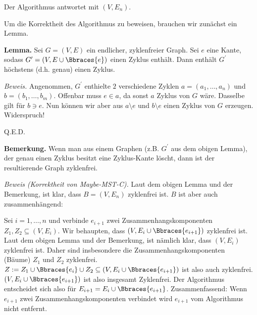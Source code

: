 \begin{solution}
\begin{enumerate}[label = (\Alph*)]
    Der Algorithmus antwortet mit $(V, E_n)$.

    Um die Korrektheit des Algorithmus zu beweisen, brauchen wir zunächst ein Lemma.

    \textbf{Lemma.}
    Sei $G = (V, E)$ ein endlicher, zyklenfreier Graph.
    Sei $e$ eine Kante, sodass $G^\prime = (V, E \cup \Bbraces{e})$ einen Zyklus enthält.
    Dann enthält $G^\prime$ höchstens (d.h. genau) einen Zyklus.

    \textit{Beweis.}
    Angenommen, $G^\prime$ enthielte $2$ verschiedene Zyklen $a = (a_1, \dots, a_n)$ und $b = (b_1, \dots, b_m)$.
    Offenbar muss $e \in a$, da sonst $a$ Zyklus von $G$ wäre.
    Dasselbe gilt für $b \ni e$.
    Nun können wir aber aus $a \setminus e$ und $b \setminus e$ einen Zyklus von $G$ erzeugen.
    Widerspruch!

    Q.E.D.

    \textbf{Bemerkung.}
    Wenn man aus einem Graphen (z.B. $G^\prime$ aus dem obigen Lemma), der genau einen Zyklus besitzt eine Zyklus-Kante löscht, dann ist der resultierende Graph zyklenfrei.

    \textit{Beweis (Korrektheit von Maybe-MST-C).}
    Laut dem obigen Lemma und der Bemerkung, ist klar, dass $B = (V, E_n)$ zyklenfrei ist.
    $B$ ist aber auch zusammenhängend:

    Sei $i = 1, \dots, n$ und verbinde $e_{i+1}$ zwei Zusammenhangskomponenten $Z_1, Z_2 \subseteq (V, E_i)$.
    Wir behaupten, dass $(V, E_i \cup \Bbraces{e_{i+1}})$ zyklenfrei ist.
    Laut dem obigen Lemma und der Bemerkung, ist nämlich klar, dass $(V, E_i)$ zyklenfrei ist.
    Daher sind insbesondere die Zusammenhangskomponenten (Bäume) $Z_1$ und $Z_2$ zyklenfrei.
    $Z := Z_1 \cup \Bbraces{e_i} \cup Z_2 \subseteq (V, E_i \cup \Bbraces{e_{i+1}})$ ist also auch zyklenfrei.
    $(V, E_i \cup \Bbraces{e_{i+1}})$ ist also insgesamt Zyklenfrei.
    Der Algorithmus entscheidet sich also für $E_{i+1} = E_i \cup \Bbraces{e_{i+1}}$.
    Zusammenfassend:
    Wenn $e_{i+1}$ zwei Zusammenhangskomponenten verbindet wird $e_{i+1}$ vom Algorithmus nicht entfernt.


\end{enumerate}
\end{solution}
